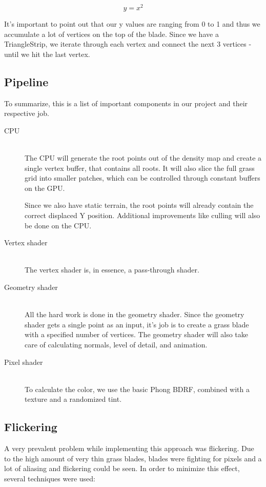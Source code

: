 \documentclass[conference]{acmsiggraph}
\begin{document}
\begin{equation}
y = x^2
\end{equation}

It's important to point out that our y values are ranging from 0 to 1 and thus we accumulate a lot of vertices on the top of the blade. Since we have a TriangleStrip, we iterate through each vertex and connect the next 3 vertices - until we hit the last vertex.

\subsection{Pipeline}
To summarize, this is a list of important components in our project and their respective job.
\begin{description}
  \item[CPU] \hfill \\
  The CPU will generate the root points out of the density map and create a single vertex buffer, that contains all roots. It will also slice the full grass grid into smaller patches, which can be controlled through constant buffers on the GPU.
  
  Since we also have static terrain, the root points will already contain the correct displaced Y position. Additional improvements like culling will also be done on the CPU.
  \item[Vertex shader] \hfill \\
  The vertex shader is, in essence, a pass-through shader.
  \item[Geometry shader] \hfill \\
  All the hard work is done in the geometry shader. Since the geometry shader gets a single point as an input, it's job is to create a grass blade with a specified number of vertices. The geometry shader will also take care of calculating normals, level of detail, and animation.
  \item[Pixel shader] \hfill \\
  To calculate the color, we use the basic Phong BDRF, combined with a texture and a randomized tint.
\end{description}

\subsection{Flickering}
A very prevalent problem while implementing this approach was flickering. Due to the high amount of very thin grass blades, blades were fighting for pixels and a lot of aliasing and flickering could be seen. In order to minimize this effect, several techniques were used:
\end{document}
